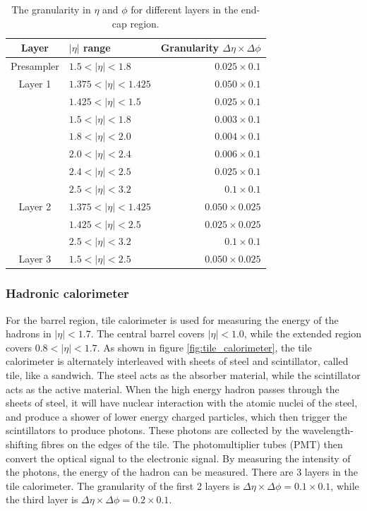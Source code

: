 \begin{table}[htpb]
\centering
\begin{tabular}{|c|l|r|}
\hline
Layer & $|\eta|$ range & Granularity $\Delta \eta \times \Delta \phi$ \\
\hline
\hline
Presampler & $1.5   < |\eta| < 1.8$   & $0.025 \times 0.1$ \\
\hline
Layer 1    & $1.375 < |\eta| < 1.425$ & $0.050 \times 0.1$ \\
           & $1.425 < |\eta| < 1.5$   & $0.025 \times 0.1$ \\
           & $1.5   < |\eta| < 1.8$   & $0.003 \times 0.1$ \\
           & $1.8   < |\eta| < 2.0$   & $0.004 \times 0.1$ \\
           & $2.0   < |\eta| < 2.4$   & $0.006 \times 0.1$ \\
           & $2.4   < |\eta| < 2.5$   & $0.025 \times 0.1$ \\
           & $2.5   < |\eta| < 3.2$   & $0.1   \times 0.1$ \\
\hline
Layer 2    & $1.375 < |\eta| < 1.425$ & $0.050 \times 0.025$ \\
           & $1.425 < |\eta| < 2.5$   & $0.025 \times 0.025$ \\
           & $2.5   < |\eta| < 3.2$   & $0.1   \times 0.1$ \\
\hline
Layer 3    & $1.5   < |\eta| < 2.5$   & $0.050 \times 0.025$ \\
\hline
\end{tabular}
\caption{The granularity in $\eta$ and $\phi$ for different layers in the end-cap region. \cite{ATLAS_doc}}
\label{tab:granularity_EM_endcap}
\end{table}

\subsubsection{Hadronic calorimeter}
For the barrel region, tile calorimeter is used for measuring the energy of the hadrons in $|\eta| < 1.7$.
The central barrel covers $|\eta| < 1.0$, while the extended region covers $0.8 < |\eta| < 1.7$.
As shown in figure \ref{fig:tile_calorimeter}, the tile calorimeter is alternately interleaved with sheets of steel and scintillator, called tile, like a sandwich.
The steel acts as the absorber material, while the scintillator acts as the active material.
When the high energy hadron passes through the sheets of steel, it will have nuclear interaction with the atomic nuclei of the steel, and produce a shower of lower energy charged particles, which then trigger the scintillators to produce photons.
These photons are collected by the wavelength-shifting fibres on the edges of the tile.
The photomultiplier tubes (PMT) then convert the optical signal to the electronic signal.
By measuring the intensity of the photons, the energy of the hadron can be measured.
There are 3 layers in the tile calorimeter.
The granularity of the first 2 layers is $\Delta \eta \times \Delta \phi = 0.1 \times 0.1$, while the third layer is $\Delta \eta \times \Delta \phi = 0.2 \times 0.1$.

